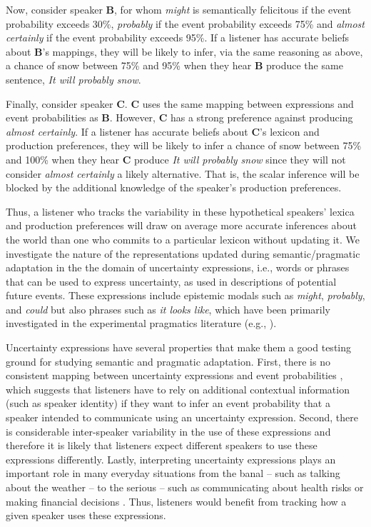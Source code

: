 \documentclass[man, floatsintext]{apa6}
\begin{document}
Now, consider speaker {\bf B}, for whom \textit{might} is semantically felicitous if the event probability exceeds 30\%, 
\textit{probably} if the event probability exceeds 75\% and \textit{almost certainly}  if the event probability exceeds 95\%. If a listener has
accurate beliefs about {\bf B}'s mappings, they will be likely to infer, via the same reasoning as above, a chance of snow between 75\% and 95\% when they hear {\bf B} produce the same sentence, \textit{It will probably snow}.

Finally, consider speaker {\bf C}. {\bf C} uses the same mapping between expressions and event probabilities as {\bf B}. However, {\bf C} has a strong preference against 
producing \textit{almost certainly}. If a listener has accurate beliefs about {\bf C}'s lexicon and production preferences, 
they will be likely to infer a chance of snow between 75\% and 100\% when they hear {\bf C} produce \textit{It will probably snow} since they will not
consider  \textit{almost certainly} a likely alternative. That is, the scalar inference will be blocked by the additional knowledge of the speaker's production preferences. 

Thus, a listener who tracks the variability in these hypothetical speakers' lexica and production preferences will draw on average more accurate inferences about the world than one who commits to a particular lexicon without updating it. We investigate the nature of the representations updated during semantic/pragmatic adaptation in the the domain of uncertainty expressions, i.e., words or phrases that can be used to express uncertainty, as used in descriptions of potential future events. These expressions include epistemic modals such as \textit{might}, 
\textit{probably}, and \textit{could} \parencite[see, for example,][]{Kratzer1991,Hacquard2011} but also phrases such as \textit{it looks like}, which have been primarily investigated in the experimental pragmatics literature (e.g., \cite{Kurumada2014,Pogue2018}).

Uncertainty expressions have several properties that make them a good testing ground for studying semantic and pragmatic
adaptation. First, there is no consistent mapping between uncertainty expressions and event probabilities \parencite[e.g.,][]{Clark1990,Pepper1974}, which suggests that listeners have to rely on additional contextual information (such as speaker identity)
if they want to infer an event probability that a speaker intended to communicate using an uncertainty expression. Second, there is considerable inter-speaker variability 
in the use of these expressions \parencite{Wallsten1986} and therefore it is likely that listeners expect different speakers to use these expressions
differently. Lastly, interpreting uncertainty expressions plays an important role in many everyday situations from the banal -- such as talking about the weather -- to the serious -- such as communicating about health risks \parencite{Berry2004, Lipkus2007, Politi2007} or making financial decisions \parencite{Doupnik2003}. 
Thus, listeners would benefit from tracking  how a given speaker uses these expressions. 
\end{document}
